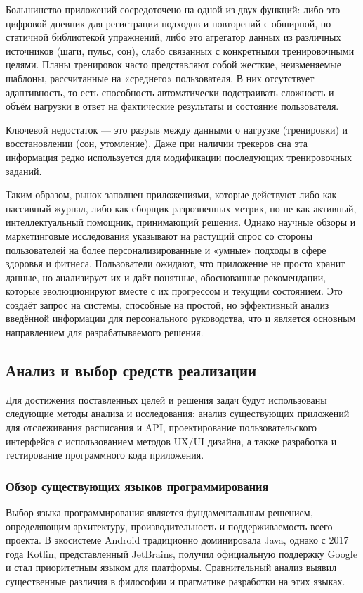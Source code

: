 Большинство приложений сосредоточено на одной из двух функций: либо это цифровой дневник для регистрации подходов и повторений с обширной, но статичной библиотекой упражнений, либо это агрегатор данных из различных источников (шаги, пульс, сон), слабо связанных с конкретными тренировочными целями. Планы тренировок часто представляют собой жесткие, неизменяемые шаблоны, рассчитанные на «среднего» пользователя. В них отсутствует адаптивность, то есть способность автоматически подстраивать сложность и объём нагрузки в ответ на фактические результаты и состояние пользователя. \cite{refl}

Ключевой недостаток — это разрыв между данными о нагрузке (тренировки) и восстановлении (сон, утомление). Даже при наличии трекеров сна эта информация редко используется для модификации последующих тренировочных заданий.

Таким образом, рынок заполнен приложениями, которые действуют либо как пассивный журнал, либо как сборщик разрозненных метрик, но не как активный, интеллектуальный помощник, принимающий решения. \cite{refl} Однако научные обзоры и маркетинговые исследования указывают на растущий спрос со стороны пользователей на более персонализированные и «умные» подходы в сфере здоровья и фитнеса. Пользователи ожидают, что приложение не просто хранит данные, но анализирует их и даёт понятные, обоснованные рекомендации, которые эволюционируют вместе с их прогрессом и текущим состоянием. Это создаёт запрос на системы, способные на простой, но эффективный анализ введённой информации для персонального руководства, что и является основным направлением для разрабатываемого решения.

\subsection{Анализ и выбор средств реализации}

Для достижения поставленных целей и решения задач будут использованы следующие методы анализа и исследования: анализ существующих приложений для отслеживания расписания и API, проектирование пользовательского интерфейса с использованием методов UX/UI дизайна, а также разработка и тестирование программного кода приложения. \cite{refa,refb}

\subsubsection{Обзор существующих языков программирования}

Выбор языка программирования является фундаментальным решением, определяющим архитектуру, производительность и поддерживаемость всего проекта. В экосистеме Android традиционно доминировала Java, однако с 2017 года Kotlin, представленный JetBrains, получил официальную поддержку Google и стал приоритетным языком для платформы. Сравнительный анализ выявил существенные различия в философии и прагматике разработки на этих языках. \cite{refb}


